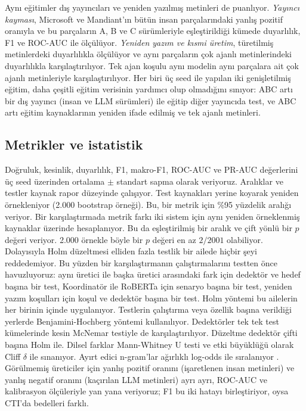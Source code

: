 \documentclass[journal]{IEEEtran}
\begin{document}
Aynı eğitimler dış yayıncıları ve yeniden yazılmış metinleri de puanlıyor. \emph{Yayıncı kayması}, Microsoft ve
Mandiant'ın bütün insan parçalarındaki yanlış pozitif oranıyla ve bu parçaların A, B ve C sürümleriyle
eşleştirildiği kümede duyarlılık, F1 ve ROC-AUC ile ölçülüyor. \emph{Yeniden yazım ve kısmi üretim}, türetilmiş
metinlerdeki duyarlılıkla ölçülüyor ve aynı parçaların çok ajanlı metinlerindeki duyarlılıkla karşılaştırılıyor.
Tek ajan koşulu aynı modelin aynı parçalara ait çok ajanlı metinleriyle karşılaştırılıyor. Her biri üç seed ile
yapılan iki genişletilmiş eğitim, daha çeşitli eğitim verisinin yardımcı olup olmadığını sınıyor: ABC artı bir dış
yayıncı (insan ve LLM sürümleri) ile eğitip diğer yayıncıda test, ve ABC artı eğitim kaynaklarının yeniden ifade
edilmiş ve tek ajanlı metinleri.

\subsection{Metrikler ve istatistik}
Doğruluk, kesinlik, duyarlılık, F1, makro-F1, ROC-AUC ve PR-AUC değerlerini üç seed üzerinden ortalama $\pm$
standart sapma olarak veriyoruz. Aralıklar ve testler kaynak rapor düzeyinde çalışıyor. Test kaynakları yerine
koyarak yeniden örnekleniyor (2{.}000 bootstrap örneği). Bu, bir metrik için \%95 yüzdelik aralığı veriyor. Bir
karşılaştırmada metrik farkı iki sistem için aynı yeniden örneklenmiş kaynaklar üzerinde hesaplanıyor. Bu da
eşleştirilmiş bir aralık ve çift yönlü bir $p$ değeri veriyor. 2{.}000 örnekle böyle bir $p$ değeri en az $2/2001$
olabiliyor. Dolayısıyla Holm düzeltmesi \cite{Holm_1979} elliden fazla testlik bir ailede hiçbir şeyi reddedemiyor.
Bu yüzden bir karşılaştırmanın çalıştırmalarını testten önce havuzluyoruz: aynı üretici ile başka üretici
arasındaki fark için dedektör ve hedef başına bir test, Koordinatör ile RoBERTa için senaryo başına bir test,
yeniden yazım koşulları için koşul ve dedektör başına bir test. Holm yöntemi bu ailelerin her birinin içinde
uygulanıyor. Testlerin çalıştırma veya özellik başına verildiği yerlerde Benjamini-Hochberg yöntemi
\cite{Benjamini_1995} kullanılıyor. Dedektörler tek tek test kümelerinde kesin McNemar testiyle de
karşılaştırılıyor. Düzeltme dedektör çifti başına Holm ile. Dilsel farklar Mann-Whitney U testi ve etki büyüklüğü
olarak Cliff $\delta$ ile sınanıyor. Ayırt edici n-gram'lar ağırlıklı log-odds ile sıralanıyor \cite{Monroe_2008}.
Görülmemiş üreticiler için yanlış pozitif oranını (işaretlenen insan metinleri) ve yanlış negatif oranını
(kaçırılan LLM metinleri) ayrı ayrı, ROC-AUC ve kalibrasyon ölçüleriyle yan yana veriyoruz; F1 bu iki hatayı
birleştiriyor, oysa CTI'da bedelleri farklı.
\end{document}
